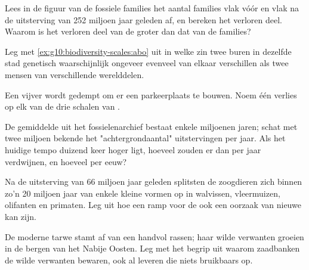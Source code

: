 \begin{exercise}[$\star\star$]\label{exo:g10:biodiversity-scales:9}
Lees in de figuur van de fossiele families het aantal families vlak vóór
en vlak na de uitsterving van 252 miljoen jaar geleden af, en bereken het
verloren deel. Waarom is het verloren deel van de \emph{} groter
dan dat van de families?
\end{exercise}

\begin{exercise}[$\star\star$]\label{exo:g10:biodiversity-scales:10}
Leg met \cref{ex:g10:biodiversity-scales:abo} uit in welke zin twee
buren in dezelfde stad genetisch waarschijnlijk ongeveer evenveel van
elkaar verschillen als twee mensen van verschillende werelddelen.
\end{exercise}

\begin{exercise}[$\star\star$]\label{exo:g10:biodiversity-scales:11}
Een vijver wordt gedempt om er een parkeerplaats te bouwen. Noem één
verlies op elk van de drie schalen van .
\end{exercise}

\begin{exercise}[$\star\star\star$]\label{exo:g10:biodiversity-scales:12}
De gemiddelde  uit het fossielenarchief bestaat enkele miljoenen
jaren; schat met twee miljoen bekende  het "achtergrondaantal"
uitstervingen per jaar. Als het huidige tempo duizend keer hoger ligt,
hoeveel  zouden er dan per jaar verdwijnen, en hoeveel per eeuw?
\end{exercise}

\begin{exercise}[$\star\star\star$]\label{exo:g10:biodiversity-scales:13}
Na de uitsterving van 66 miljoen jaar geleden splitsten de zoogdieren
zich binnen zo'n 20 miljoen jaar van enkele kleine vormen op in
walvissen, vleermuizen, olifanten en primaten. Leg uit hoe een ramp voor
de  ook een oorzaak van nieuwe  kan zijn.
\end{exercise}

\begin{exercise}[$\star\star\star$]\label{exo:g10:biodiversity-scales:14}
De moderne tarwe stamt af van een handvol rassen; haar wilde verwanten
groeien in de bergen van het Nabije Oosten. Leg met het begrip
 uit waarom zaadbanken de wilde verwanten bewaren,
ook al leveren die niets bruikbaars op.
\end{exercise}

